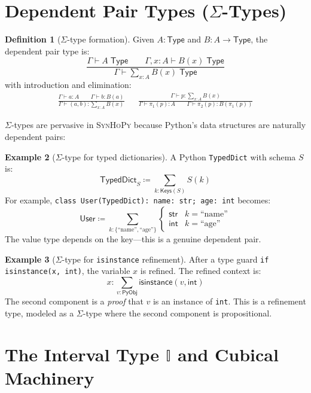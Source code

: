 \documentclass[11pt,a4paper]{report}
\theoremstyle{definition}
\newtheorem{definition}{Definition}[chapter]
\newtheorem{example}[definition]{Example}
\theoremstyle{plain}
\newcommand{\Type}{\mathsf{Type}}
\newcommand{\PyObj}{\mathsf{PyObj}}
\newcommand{\interval}{\mathbb{I}}
\newcommand{\defeq}{\coloneqq}
\newcommand{\synhopy}{\textsc{SynHoPy}}
\begin{document}
\section{Dependent Pair Types ($\Sigma$-Types)}

\begin{definition}[$\Sigma$-type formation]
Given $A : \Type$ and $B : A \to \Type$, the dependent pair type is:
\[
  \frac{\Gamma \vdash A \;\Type \qquad \Gamma, x : A \vdash B(x) \;\Type}
       {\Gamma \vdash \sum_{x : A} B(x) \;\Type}
\]
with introduction and elimination:
\begin{align}
  \frac{\Gamma \vdash a : A \qquad \Gamma \vdash b : B(a)}
       {\Gamma \vdash (a, b) : \sum_{x : A} B(x)}
  &&
  \frac{\Gamma \vdash p : \sum_{x : A} B(x)}
       {\Gamma \vdash \pi_1(p) : A \qquad \Gamma \vdash \pi_2(p) : B(\pi_1(p))}
\end{align}
\end{definition}

$\Sigma$-types are pervasive in \synhopy{} because Python's data structures
are naturally dependent pairs:

\begin{example}[$\Sigma$-type for typed dictionaries]
A Python \lstinline[style=python]{TypedDict} with schema $S$ is:
\[
  \mathsf{TypedDict}_S \defeq \sum_{k : \mathsf{Keys}(S)} S(k)
\]
For example, \lstinline[style=python]{class User(TypedDict): name: str; age: int}
becomes:
\[
  \mathsf{User} \defeq \sum_{k : \{\text{``name''}, \text{``age''}\}}
    \begin{cases}
      \mathsf{str} & k = \text{``name''} \\
      \mathsf{int} & k = \text{``age''}
    \end{cases}
\]
The value type depends on the key---this is a genuine dependent pair.
\end{example}

\begin{example}[$\Sigma$-type for \texttt{isinstance} refinement]
After a type guard \lstinline[style=python]{if isinstance(x, int)}, the
variable $x$ is refined.  The refined context is:
\[
  x : \sum_{v : \PyObj} \mathsf{isinstance}(v, \mathsf{int})
\]
The second component is a \emph{proof} that $v$ is an instance of
\lstinline[style=python]{int}.  This is a refinement type, modeled as a
$\Sigma$-type where the second component is propositional.
\end{example}


\section{The Interval Type $\interval$ and Cubical Machinery}
\end{document}
